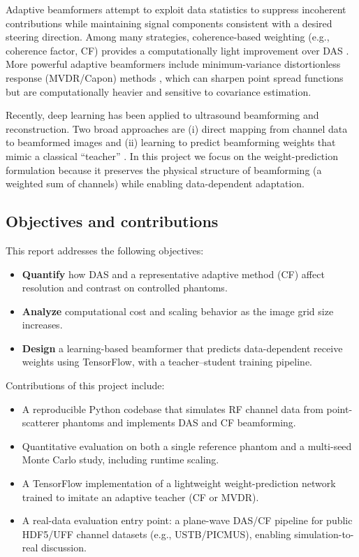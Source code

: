 \documentclass[conference]{IEEEtran}
\begin{document}
Adaptive beamformers attempt to exploit data statistics to suppress incoherent contributions while maintaining signal components consistent with a desired steering direction. Among many strategies, coherence-based weighting (e.g., coherence factor, CF) provides a computationally light improvement over DAS \cite{mallart1994adaptive}. More powerful adaptive beamformers include minimum-variance distortionless response (MVDR/Capon) methods \cite{capon1969high,vanveen1988beamforming}, which can sharpen point spread functions but are computationally heavier and sensitive to covariance estimation.

Recently, deep learning has been applied to ultrasound beamforming and reconstruction. Two broad approaches are (i) direct mapping from channel data to beamformed images and (ii) learning to predict beamforming weights that mimic a classical ``teacher'' \cite{luchies2018dnn,luijten2019icassp,vanSloun2020dlus,cubdl2020}. In this project we focus on the weight-prediction formulation because it preserves the physical structure of beamforming (a weighted sum of channels) while enabling data-dependent adaptation.

\subsection{Objectives and contributions}
This report addresses the following objectives:
\begin{itemize}
    \item \textbf{Quantify} how DAS and a representative adaptive method (CF) affect resolution and contrast on controlled phantoms.
    \item \textbf{Analyze} computational cost and scaling behavior as the image grid size increases.
    \item \textbf{Design} a learning-based beamformer that predicts data-dependent receive weights using TensorFlow, with a teacher--student training pipeline.
\end{itemize}

Contributions of this project include:
\begin{itemize}
    \item A reproducible Python codebase that simulates RF channel data from point-scatterer phantoms and implements DAS and CF beamforming.
    \item Quantitative evaluation on both a single reference phantom and a multi-seed Monte Carlo study, including runtime scaling.
    \item A TensorFlow implementation of a lightweight weight-prediction network trained to imitate an adaptive teacher (CF or MVDR).
    \item A real-data evaluation entry point: a plane-wave DAS/CF pipeline for public HDF5/UFF channel datasets (e.g., USTB/PICMUS), enabling simulation-to-real discussion.
\end{itemize}
\end{document}
